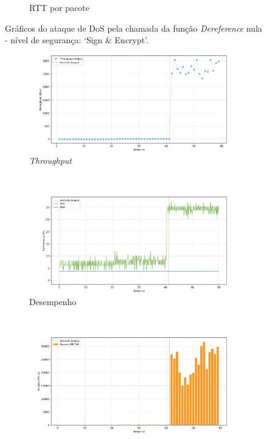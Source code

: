 \begin{apendicesenv}
\begin{figure}[htbp!]
\begin{subfigure}[t]{0.5\textwidth}
        \caption{RTT por pacote}
    \end{subfigure}%
    \label{fig:2-dos_function_call_null_deref}
    \caption{Gráficos do ataque de DoS pela chamada da função \textit{Dereference} nula - nível de segurança: `Sign \& Encrypt'.}
\end{figure}

\begin{figure}[htbp!]
    \centering
    \begin{subfigure}[t]{0.5\textwidth}
        \centering
        \includegraphics[width=1\textwidth, height=120pt]{USPSC-img/output/cropped/0-dos_hping3-tput.png}
        \caption{\textit{Throughput}}
    \end{subfigure}%
    ~ 
    \begin{subfigure}[t]{0.5\textwidth}
        \centering
        \includegraphics[width=1\textwidth, height=120pt]{USPSC-img/output/cropped/0-dos_hping3-perf.png}
        \caption{Desempenho}
    \end{subfigure}%
    \\
    \begin{subfigure}[t]{0.5\textwidth}
        \centering
        \includegraphics[width=1\textwidth, height=120pt]{USPSC-img/output/cropped/0-dos_hping3-pack.png}

\end{subfigure}
\end{figure}
\end{apendicesenv}
